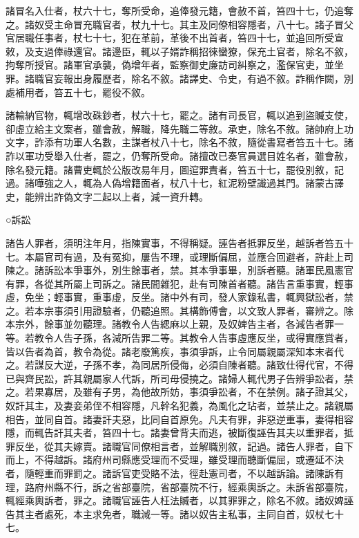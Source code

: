 \begin{pinyinscope}
 諸冒名入仕者，杖六十七，奪所受命，追俸發元籍，會赦不首，笞四十七，仍追奪之。諸奴受主命冒充職官者，杖九十七。其主及同僚相容隱者，八十七。諸子冒父官居職任事者，杖七十七，犯在革前，革後不出首者，笞四十七，並追回所受宣敕，及支過俸祿還官。諸邊臣，輒以子婿詐稱招徠蠻獠，保充土官者，除名不敘，拘奪所授官。諸軍官承襲，偽增年者，監察御史廉訪司糾察之，濫保官吏，並坐罪。諸職官妄報出身履歷者，除名不敘。諸譯史、令史，有過不敘。詐稱作闕，別處補用者，笞五十七，罷役不敘。



 諸輸納官物，輒增改硃鈔者，杖六十七，罷之。諸有司長官，輒以追到盜贓支使，卻虛立給主文案者，雖會赦，解職，降先職二等敘。承吏，除名不敘。諸帥府上功文字，詐添有功軍人名數，主謀者杖八十七，除名不敘，隨從書寫者笞五十七。諸詐以軍功受舉入仕者，罷之，仍奪所受命。諸擅改已奏官員選目姓名者，雖會赦，除名發元籍。諸曹吏輒於公版改易年月，圖逭罪責者，笞五十七，罷役別敘，記過。諸嘩強之人，輒為人偽增籍面者，杖八十七，紅泥粉壁識過其門。諸蒙古譯史，能辨出詐偽文字二起以上者，減一資升轉。



 ○訴訟



 諸告人罪者，須明注年月，指陳實事，不得稱疑。誣告者抵罪反坐，越訴者笞五十七。本屬官司有過，及有冤抑，屢告不理，或理斷偏屈，並應合回避者，許赴上司陳之。諸訴訟本爭事外，別生餘事者，禁。其本爭事畢，別訴者聽。諸軍民風憲官有罪，各從其所屬上司訴之。諸民間雜犯，赴有司陳首者聽。諸告言重事實，輕事虛，免坐；輕事實，重事虛，反坐。諸中外有司，發人家錄私書，輒興獄訟者，禁之。若本宗事須引用證驗者，仍聽追照。其構飾傅會，以文致人罪者，審辨之。除本宗外，餘事並勿聽理。諸教令人告緦麻以上親，及奴婢告主者，各減告者罪一等。若教令人告子孫，各減所告罪二等。其教令人告事虛應反坐，或得實應賞者，皆以告者為首，教令為從。諸老廢篤疾，事須爭訴，止令同屬親屬深知本末者代之。若謀反大逆，子孫不孝，為同居所侵侮，必須自陳者聽。諸致仕得代官，不得已與齊民訟，許其親屬家人代訴，所司毋侵撓之。諸婦人輒代男子告辨爭訟者，禁之。若果寡居，及雖有子男，為他故所妨，事須爭訟者，不在禁例。諸子證其父，奴訐其主，及妻妾弟侄不相容隱，凡幹名犯義，為風化之玷者，並禁止之。諸親屬相告，並同自首。諸妻訐夫惡，比同自首原免。凡夫有罪，非惡逆重事，妻得相容隱，而輒告訐其夫者，笞四十七。諸妻曾背夫而逃，被斷復誣告其夫以重罪者，抵罪反坐，從其夫嫁賣。諸職官同僚相言者，並解職別敘，記過。諸告人罪者，自下而上，不得越訴。諸府州司縣應受理而不受理，雖受理而聽斷偏屈，或遷延不決者，隨輕重而罪罰之。諸訴官吏受賂不法，徑赴憲司者，不以越訴論。諸陳訴有理，路府州縣不行，訴之省部臺院，省部臺院不行，經乘輿訴之。未訴省部臺院，輒經乘輿訴者，罪之。諸職官誣告人枉法贓者，以其罪罪之，除名不敘。諸奴婢誣告其主者處死，本主求免者，職減一等。諸以奴告主私事，主同自首，奴杖七十七。




\end{pinyinscope}

